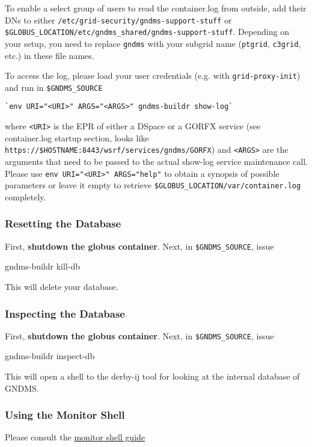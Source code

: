 \documentclass{article}
\begin{document}
To enable a select group of users to read the container.log from
outside, add their DNs to either
\verb!/etc/grid-security/gndms-support-stuff! or
\verb!$GLOBUS_LOCATION/etc/gndms_shared/gndms-support-stuff!.
Depending on your setup, you need to replace \verb!gndms! with your
subgrid name (\verb!ptgrid!, \verb!c3grid!, etc.) in these file
names.

To access the log, please load your user credentials (e.g. with
\verb!grid-proxy-init!) and run in \verb!$GNDMS_SOURCE!

\begin{verbatim}
`env URI="<URI>" ARGS="<ARGS>" gndms-buildr show-log`
\end{verbatim}
where \verb!<URI>! is the EPR of either a DSpace or a GORFX service
(see container.log startup section, looks like
\verb!https://$HOSTNAME:8443/wsrf/services/gndms/GORFX!) and
\verb!<ARGS>! are the arguments that need to be passed to the
actual show-log service maintenance call. Please use
\verb!env URI="<URI>" ARGS="help"! to obtain a synopsis of possible
parameters or leave it empty to retrieve
\verb!$GLOBUS_LOCATION/var/container.log! completely.

\subsubsection{Resetting the Database}

First, \textbf{shutdown the globus container}. Next, in
\verb!$GNDMS_SOURCE!, issue

gndms-buildr kill-db

This will delete your database.

\subsubsection{Inspecting the Database}

First, \textbf{shutdown the globus container}. Next, in
\verb!$GNDMS_SOURCE!, issue

gndms-buildr inspect-db

This will open a shell to the derby-ij tool for looking at the
internal database of GNDMS.

\subsubsection{Using the Monitor Shell}

Please consult the \href{/moni-guide}{monitor shell guide}
\end{document}
